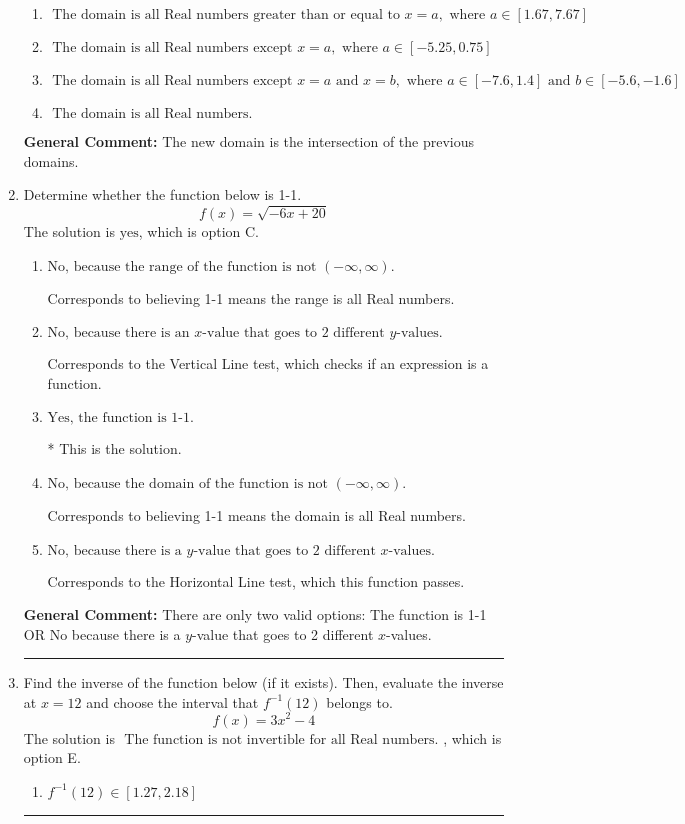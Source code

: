 \documentclass{extbook}[14pt]
\newcommand{\litem}[1]{\item #1

\rule{\textwidth}{0.4pt}}
\begin{document}
\begin{enumerate}
{\begin{enumerate}[label=\Alph*.]
\item \( \text{ The domain is all Real numbers greater than or equal to } x = a, \text{ where } a \in [1.67, 7.67] \)


\item \( \text{ The domain is all Real numbers except } x = a, \text{ where } a \in [-5.25, 0.75] \)


\item \( \text{ The domain is all Real numbers except } x = a \text{ and } x = b, \text{ where } a \in [-7.6, 1.4] \text{ and } b \in [-5.6, -1.6] \)


\item \( \text{ The domain is all Real numbers. } \)


\end{enumerate}

\textbf{General Comment:} The new domain is the intersection of the previous domains.
}
\litem{
Determine whether the function below is 1-1.
\[ f(x) = \sqrt{-6 x + 20} \]The solution is \( \text{yes} \), which is option C.\begin{enumerate}[label=\Alph*.]
\item \( \text{No, because the range of the function is not $(-\infty, \infty)$.} \)

Corresponds to believing 1-1 means the range is all Real numbers.
\item \( \text{No, because there is an $x$-value that goes to 2 different $y$-values.} \)

Corresponds to the Vertical Line test, which checks if an expression is a function.
\item \( \text{Yes, the function is 1-1.} \)

* This is the solution.
\item \( \text{No, because the domain of the function is not $(-\infty, \infty)$.} \)

Corresponds to believing 1-1 means the domain is all Real numbers.
\item \( \text{No, because there is a $y$-value that goes to 2 different $x$-values.} \)

Corresponds to the Horizontal Line test, which this function passes.
\end{enumerate}

\textbf{General Comment:} There are only two valid options: The function is 1-1 OR No because there is a $y$-value that goes to 2 different $x$-values.
}
\litem{
Find the inverse of the function below (if it exists). Then, evaluate the inverse at $x = 12$ and choose the interval that $f^{-1}(12)$ belongs to.
\[ f(x) = 3 x^2 - 4 \]The solution is \( \text{ The function is not invertible for all Real numbers. } \), which is option E.\begin{enumerate}[label=\Alph*.]
\item \( f^{-1}(12) \in [1.27, 2.18] \)


\end{enumerate}}
\end{enumerate}
\end{document}
